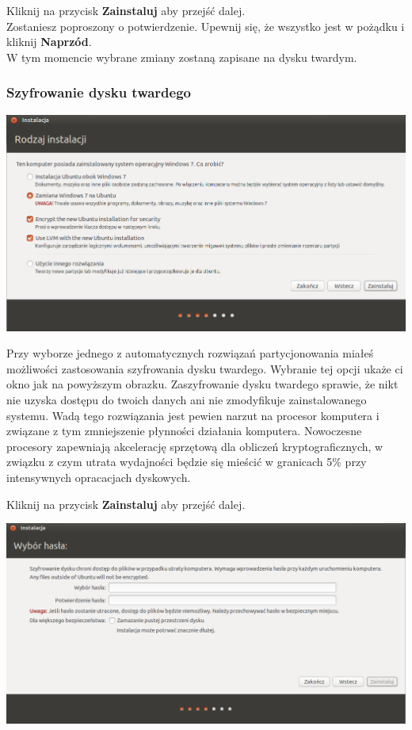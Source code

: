 \begin{flushright}
Kliknij na przycisk \textbf{Zainstaluj} aby przejść dalej.\\
Zostaniesz poproszony o potwierdzenie. Upewnij się, że wszystko jest w pożądku i kliknij \textbf{Naprzód}.\\
W tym momencie wybrane zmiany zostaną zapisane na dysku twardym.
\end{flushright}
\clearpage

\subsubsection{Szyfrowanie dysku twardego}
\begin{center}
	\includegraphics[scale=0.5]{images/instalator_partycjonowanie_szyfrowanie1.png}
\end{center}
Przy wyborze jednego z automatycznych rozwiązań partycjonowania miałeś możliwości zastosowania szyfrowania dysku twardego. Wybranie tej opcji ukaże ci okno jak na powyższym obrazku. Zaszyfrowanie dysku twardego sprawie, że nikt nie uzyska dostępu do twoich danych ani nie zmodyfikuje zainstalowanego systemu. Wadą tego rozwiązania jest pewien narzut na procesor komputera i związane z tym zmniejszenie płynności działania komputera. Nowoczesne procesory zapewniają akcelerację sprzętową dla obliczeń kryptograficznych, w związku z czym utrata wydajności będzie się mieścić w granicach 5\% przy intensywnych opracacjach dyskowych.
\begin{flushright}
Kliknij na przycisk \textbf{Zainstaluj} aby przejść dalej.
\end{flushright}
\clearpage
\begin{center}
	\includegraphics[scale=0.5]{images/instalator_partycjonowanie_szyfrowanie2.png}
\end{center}
